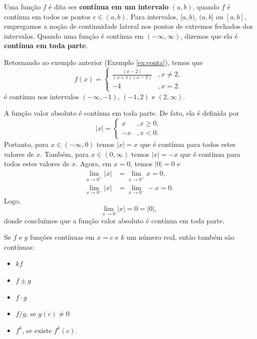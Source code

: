 Uma função $f$ é dita ser {\bf contínua em um intervalo} $(a, b)$, quando $f$ é contínua em todos os pontos $c\in (a, b)$. Para intervalos, $[a, b)$, $(a, b]$ ou $[a, b]$, empregamos a noção de continuidade lateral nos pontos de extremos fechados dos intervalos. Quando uma função é contínua em $(-\infty, \infty)$, dizemos que ela é {\bf contínua em toda parte}.

\begin{ex}
  Retornando ao exemplo anterior (Exemplo \ref{ex:conta}), temos que
  \begin{equation}
    f(x) = \left\{
      \begin{array}{ll}
        \frac{(x-2)}{(x+1)(x-2)} &, x\neq 2,\\
        -4 &, x=2.
      \end{array}
    \right.
  \end{equation}
  é contínua nos intervalos $(-\infty, -1)$, $(-1, 2)$ e $(2, \infty)$.
\end{ex}

\begin{ex}
  A função valor absoluto é contínua em toda parte. De fato, ela é definida por
  \begin{equation}
    |x| = \left\{
      \begin{array}{ll}
        x &, x\geq 0,\\
        -x &, x<0.
      \end{array}
    \right.
  \end{equation}
  Portanto, para $x\in(-\infty, 0)$ temos $|x| = x$ que é contínua para todos estes valores de $x$. Também, para $x\in(0,\infty)$ temos $|x|=-x$ que é contínua para todos estes valores de $x$. Agora, em $x=0$, temos $|0|=0$ e
  \begin{align}
    \lim_{x\to 0^+} |x| &= \lim_{x\to 0^+} x = 0,\\
    \lim_{x\to 0^-} |x| &= \lim_{x\to 0^-} -x = 0.
  \end{align}
  Logo,
  \begin{equation}
    \lim_{x\to 0} |x| = 0 = |0|,
  \end{equation}
  donde concluímos que a função valor absoluto é contínua em toda parte.
\end{ex}

\begin{prop}
  Se $f$ e $g$ funções contínuas em $x=c$ e $k$ um número real, então também são contínuas:
  \begin{itemize}
  \item $kf$
  \item $f\pm g$
  \item $f\cdot g$
  \item $f/g$, se $g(c)\neq 0$
  \item $f^k$, se existe $f^k(c)$.
  \end{itemize}
\end{prop}

